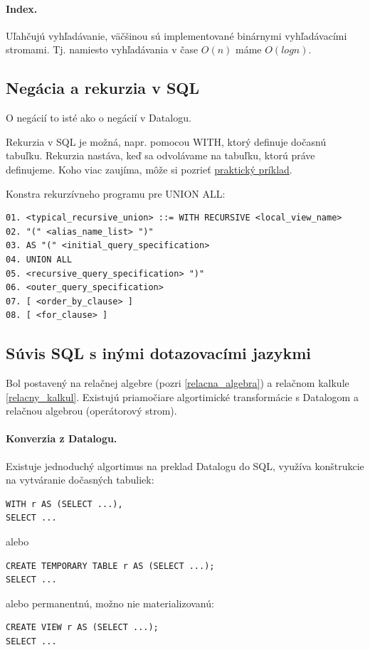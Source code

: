 \documentclass[10pt,a4paper]{article}
\begin{document}
\paragraph{Index.}
Uľahčujú vyhľadávanie, väčšinou sú implementované binárnymi vyhľadávacími stromami.
Tj. namiesto vyhľadávania v čase $O(n)$ máme $O(logn)$.

\subsection{Negácia a rekurzia v SQL}

O negácií to isté ako o negácií v Datalogu. 

Rekurzia v SQL je možná, napr. pomocou WITH, ktorý definuje dočasnú tabuľku. Rekurzia nastáva, keď sa odvolávame na tabuľku, ktorú práve definujeme. Koho viac zaujíma, môže si pozrieť \href{http://sqlanywhere.blogspot.sk/2012/04/example-recursive-union.html}{praktický príklad}. 

Konstra rekurzívneho programu pre UNION ALL: 
\begin{verbatim}
01. <typical_recursive_union> ::= WITH RECURSIVE <local_view_name>
02. "(" <alias_name_list> ")"
03. AS "(" <initial_query_specification>
04. UNION ALL
05. <recursive_query_specification> ")"
06. <outer_query_specification>
07. [ <order_by_clause> ]
08. [ <for_clause> ]
\end{verbatim} 

\subsection{Súvis SQL s inými dotazovacími jazykmi}

Bol postavený na relačnej algebre (pozri \ref{relacna_algebra}) a relačnom kalkule \ref{relacny_kalkul}. Existujú priamočiare algortimické transformácie s Datalogom a relačnou algebrou (operátorový strom). 
 
\paragraph{Konverzia z Datalogu.}
Existuje jednoduchý algortimus na preklad Datalogu do SQL,
využíva konštrukcie na vytváranie dočasných tabuliek: 
\begin{verbatim}
WITH r AS (SELECT ...),
SELECT ...
\end{verbatim} 
alebo
\begin{verbatim}
CREATE TEMPORARY TABLE r AS (SELECT ...);
SELECT ...
\end{verbatim}
alebo permanentnú, možno nie materializovanú: 
\begin{verbatim}
CREATE VIEW r AS (SELECT ...);
SELECT ...
\end{verbatim}
\end{document}
